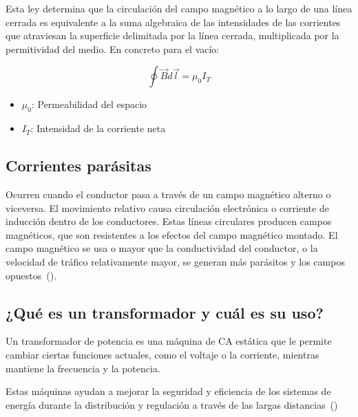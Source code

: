 \documentclass[twocolumn, 12pt]{article}
\begin{document}
Esta ley determina que la circulación del campo magnético a
lo largo de una línea cerrada es equivalente a la suma
algebraica de las intensidades de las corrientes que
atraviesan la superficie delimitada por la línea cerrada,
multiplicada por la permitividad del medio. En concreto
para el vacío:

{\Large
\begin{equation}
	\oint \vec{B} d \vec{l} = \mu_{\scriptscriptstyle 0} I_{\scriptscriptstyle T}
\end{equation}
}

\begin{itemize}[label=$\triangleright$]
	\item {\Large $\mu_0$}: Permeabilidad del espacio
	\item {\Large $I_T$}: Intensidad de la corriente neta
\end{itemize}

\nocite{FenomenosElectromagneticos}

\subsection*{Corrientes parásitas}

Ocurren cuando el conductor pasa a través de un campo
magnético alterno o viceversa. El movimiento relativo causa
circulación electrónica o corriente de inducción dentro de
los conductores. Estas líneas circulares producen campos
magnéticos, que son resistentes a los efectos del campo
magnético montado. El campo magnético se usa o mayor que la
conductividad del conductor, o la velocidad de tráfico
relativamente mayor, se generan más parásitos y los campos
opuestos~(\cite{FenomenosElectromagneticos}).

\subsection*{¿Qué es un transformador y cuál es su uso?}

Un transformador de potencia es una máquina de CA estática
que le permite cambiar ciertas funciones actuales, como el
voltaje o la corriente, mientras mantiene la frecuencia y
la potencia.

Estas máquinas ayudan a mejorar la seguridad y eficiencia
de los sistemas de energía durante la distribución y
regulación a través de las largas
distancias~(\cite{FenomenosElectromagneticos})

\newpage

\printbibliography
\end{document}
